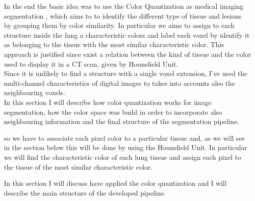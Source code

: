 	In the end the basic idea was to use the Color Quantization as medical imaging segmentation , which aims to to identify the different type of tissue and lesions by grouping them by color similarity. In particular we aims to assign to each structure inside the lung a characteristic colors and label each voxel by identify it as belonging to the tissue with the most similar characteristic color. This approach is justified since exist a relation between the kind of tissue and the color used to display it in a CT scan, given by Hounsfield Unit.\\
	Since it is unlikely to find a structure with a single voxel extension, I've used the multi-channel characteristics of digital images to takes into accounts also the neighbouring voxels.\\
	
	In this section I will describe how color quantization works for image segmentation, how the color space was build in order to incorporate also neighbouring information and the final structure of the segmentation pipeline.
	
	
	 so we have to associate each pixel color to a particular tissue and, as we will see in the section below this will be done by using the Hounsfield Unit. In particular we will find the characteristic color of each lung tissue and assign each pixel to the tissue of the most similar characteristic color. 
	
	In this section I will discuss have applied the color quantization and I will describe the main structure of the developed pipeline.


